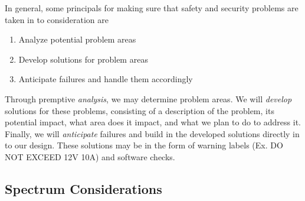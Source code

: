 In general, some principals for making sure that safety and security problems
are taken in to consideration are

\begin{enumerate} \item Analyze potential problem areas \item Develop solutions
for problem areas \item Anticipate failures and handle them accordingly
\end{enumerate}

Through premptive \emph{analysis}, we may determine problem areas. We will
\emph{develop} solutions for these problems, consisting of a description of the
problem, its potential impact, what area does it impact, and what we plan to do
to address it. Finally, we will \emph{anticipate} failures and build in the
developed solutions directly in to our design. These solutions may be in the
form of warning labels (Ex. DO NOT EXCEED 12V 10A) and software checks.

\subsection{Spectrum Considerations}

